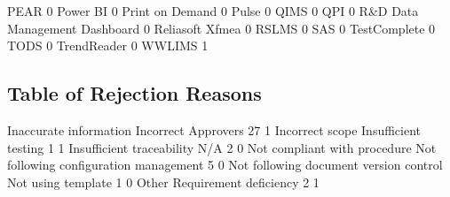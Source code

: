\documentclass{article}
\begin{document}
\begin{Schunk}
\begin{Soutput}
  PEAR                                                                    0
  Power BI                                                                0
  Print on Demand                                                         0
  Pulse                                                                   0
  QIMS                                                                    0
  QPI                                                                     0
  R&D Data Management Dashboard                                           0
  Reliasoft Xfmea                                                         0
  RSLMS                                                                   0
  SAS                                                                     0
  TestComplete                                                            0
  TODS                                                                    0
  TrendReader                                                             0
  WWLIMS                                                                  1
\end{Soutput}
\end{Schunk}

\subsection{Table of Rejection Reasons}
\begin{Schunk}
\begin{Soutput}
                Inaccurate information                    Incorrect Approvers 
                                    27                                      1 
                       Incorrect scope                   Insufficient testing 
                                     1                                      1 
             Insufficient traceability                                    N/A 
                                     2                                      0 
          Not compliant with procedure Not following configuration management 
                                     5                                      0 
Not following document version control                     Not using template 
                                     1                                      0 
                                 Other                 Requirement deficiency 
                                     2                                      1 
\end{Soutput}
\end{Schunk}
\end{document}
